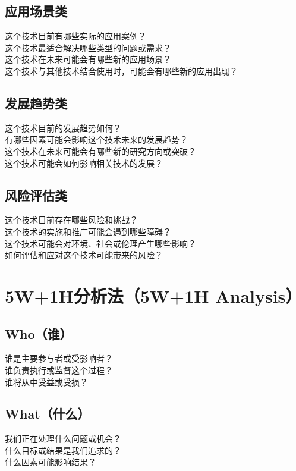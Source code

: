\documentclass[12pt]{book}
\begin{document}
\subsection{应用场景类}
这个技术目前有哪些实际的应用案例？\\
这个技术最适合解决哪些类型的问题或需求？\\
这个技术在未来可能会有哪些新的应用场景？\\
这个技术与其他技术结合使用时，可能会有哪些新的应用出现？\\

\subsection{发展趋势类}
这个技术目前的发展趋势如何？\\
有哪些因素可能会影响这个技术未来的发展趋势？\\
这个技术在未来可能会有哪些新的研究方向或突破？\\
这个技术可能会如何影响相关技术的发展？\\

\subsection{风险评估类}
这个技术目前存在哪些风险和挑战？\\
这个技术的实施和推广可能会遇到哪些障碍？\\
这个技术可能会对环境、社会或伦理产生哪些影响？\\
如何评估和应对这个技术可能带来的风险？\\


\section{5W+1H分析法（5W+1H Analysis）}
\subsection{Who（谁）}
谁是主要参与者或受影响者？\\
谁负责执行或监督这个过程？\\
谁将从中受益或受损？\\

\subsection{What（什么）}
我们正在处理什么问题或机会？\\
什么目标或结果是我们追求的？\\
什么因素可能影响结果？\\
\end{document}
